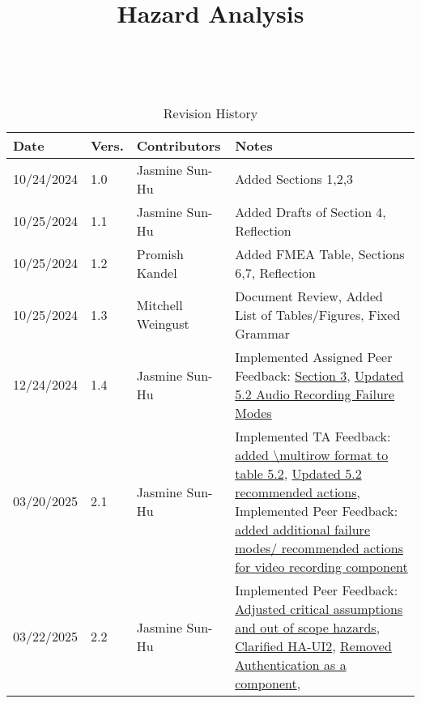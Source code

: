 \documentclass{article}
\title{Hazard Analysis\\\progname}
\author{\authname}
\date{}
\begin{document}
\maketitle
\thispagestyle{empty}

~\newpage


\begin{table}[hp]
\caption{Revision History} \label{TblRevisionHistory}
\begin{tabularx}{\textwidth}{p{1.5cm}p{1cm}p{3.5cm}X}
\toprule {\textbf{Date}} & {\textbf{Vers.}} & {\textbf{Contributors}} & {\textbf{Notes}}\\
\midrule
10/24/2024 & 1.0 & Jasmine Sun-Hu & Added Sections 1,2,3\\
10/25/2024 & 1.1 & Jasmine Sun-Hu & Added Drafts of Section 4, Reflection\\
10/25/2024 & 1.2 & Promish Kandel & Added FMEA Table, Sections 6,7, Reflection\\
10/25/2024 & 1.3 & Mitchell Weingust & Document Review, Added List of Tables/Figures, Fixed Grammar\\
12/24/2024 & 1.4 & Jasmine Sun-Hu & Implemented Assigned Peer Feedback: \href{https://github.com/parishanizam/TeleHealth/issues/131}{Section 3}, \href{https://github.com/parishanizam/TeleHealth/issues/157}{Updated 5.2 Audio Recording Failure Modes}\\
03/20/2025 & 2.1 & Jasmine Sun-Hu & Implemented TA Feedback: \href{https://github.com/parishanizam/TeleHealth/issues/233}{added \textbackslash multirow format to table 5.2}, \href{https://github.com/parishanizam/TeleHealth/issues/234}{Updated 5.2 recommended actions}, Implemented Peer Feedback: \href{https://github.com/parishanizam/TeleHealth/issues/153}{added additional failure modes/ recommended actions for video recording component}\\
03/22/2025 & 2.2 & Jasmine Sun-Hu & Implemented Peer Feedback: \href{https://github.com/parishanizam/TeleHealth/issues/155}{Adjusted critical assumptions and out of scope hazards}, \href{https://github.com/parishanizam/TeleHealth/issues/156}{Clarified HA-UI2}, \href{https://github.com/parishanizam/TeleHealth/issues/159}{Removed Authentication as a component}, \\
\bottomrule
\end{tabularx}
\end{table}

~\newpage

\tableofcontents
\listoffigures
\listoftables
\end{document}
